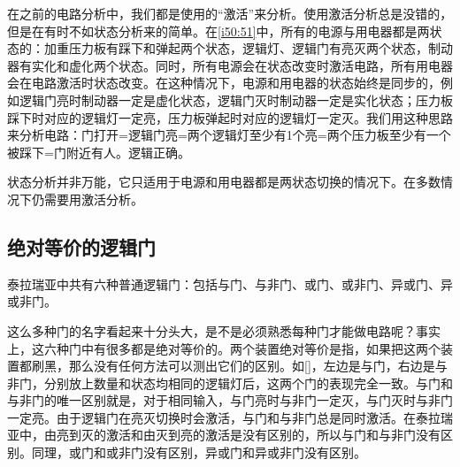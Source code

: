 \begin{figure}[!h]
\begin{center}
\end{center}
\caption{}
\label{i50:51}
\end{figure}

在之前的电路分析中，我们都是使用的“激活”来分析。使用激活分析总是没错的，但是在有时不如状态分析来的简单。在\autoref{i50:51}中，所有的电源与用电器都是两状态的：加重压力板有踩下和弹起两个状态，逻辑灯、逻辑门有亮灭两个状态，制动器有实化和虚化两个状态。同时，所有电源会在状态改变时激活电路，所有用电器会在电路激活时状态改变。在这种情况下，电源和用电器的状态始终是同步的，例如逻辑门亮时制动器一定是虚化状态，逻辑门灭时制动器一定是实化状态；压力板踩下时对应的逻辑灯一定亮，压力板弹起时对应的逻辑灯一定灭。我们用这种思路来分析电路：门打开=逻辑门亮=两个逻辑灯至少有1个亮=两个压力板至少有一个被踩下=门附近有人。逻辑正确。

状态分析并非万能，它只适用于电源和用电器都是两状态切换的情况下。在多数情况下仍需要用激活分析。

\subsection{绝对等价的逻辑门}
泰拉瑞亚中共有六种普通逻辑门：包括与门、与非门、或门、或非门、异或门、异或非门。

这么多种门的名字看起来十分头大，是不是必须熟悉每种门才能做电路呢？事实上，这六种门中有很多都是绝对等价的。两个装置绝对等价是指，如果把这两个装置都刷黑，那么没有任何方法可以测出它们的区别。如\autoref{}，左边是与门，右边是与非门，分别放上数量和状态均相同的逻辑灯后，这两个门的表现完全一致。与门和与非门的唯一区别就是，对于相同输入，与门亮时与非门一定灭，与门灭时与非门一定亮。由于逻辑门在亮灭切换时会激活，与门和与非门总是同时激活。在泰拉瑞亚中，由亮到灭的激活和由灭到亮的激活是没有区别的，所以与门和与非门没有区别。同理，或门和或非门没有区别，异或门和异或非门没有区别。

